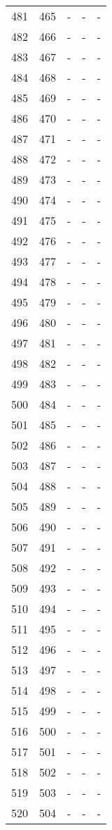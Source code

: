 \documentclass[10pt]{article}
\begin{document}
\begin {longtable}{l r r r r}
481 & 465 & - & - & - \\
482 & 466 & - & - & - \\
483 & 467 & - & - & - \\
484 & 468 & - & - & - \\
485 & 469 & - & - & - \\
486 & 470 & - & - & - \\
487 & 471 & - & - & - \\
488 & 472 & - & - & - \\
489 & 473 & - & - & - \\
490 & 474 & - & - & - \\
491 & 475 & - & - & - \\
492 & 476 & - & - & - \\
493 & 477 & - & - & - \\
494 & 478 & - & - & - \\
495 & 479 & - & - & - \\
496 & 480 & - & - & - \\
497 & 481 & - & - & - \\
498 & 482 & - & - & - \\
499 & 483 & - & - & - \\
500 & 484 & - & - & - \\
501 & 485 & - & - & - \\
502 & 486 & - & - & - \\
503 & 487 & - & - & - \\
504 & 488 & - & - & - \\
505 & 489 & - & - & - \\
506 & 490 & - & - & - \\
507 & 491 & - & - & - \\
508 & 492 & - & - & - \\
509 & 493 & - & - & - \\
510 & 494 & - & - & - \\
511 & 495 & - & - & - \\
512 & 496 & - & - & - \\
513 & 497 & - & - & - \\
514 & 498 & - & - & - \\
515 & 499 & - & - & - \\
516 & 500 & - & - & - \\
517 & 501 & - & - & - \\
518 & 502 & - & - & - \\
519 & 503 & - & - & - \\
520 & 504 & - & - & - \\

\end{longtable}
\end{document}
